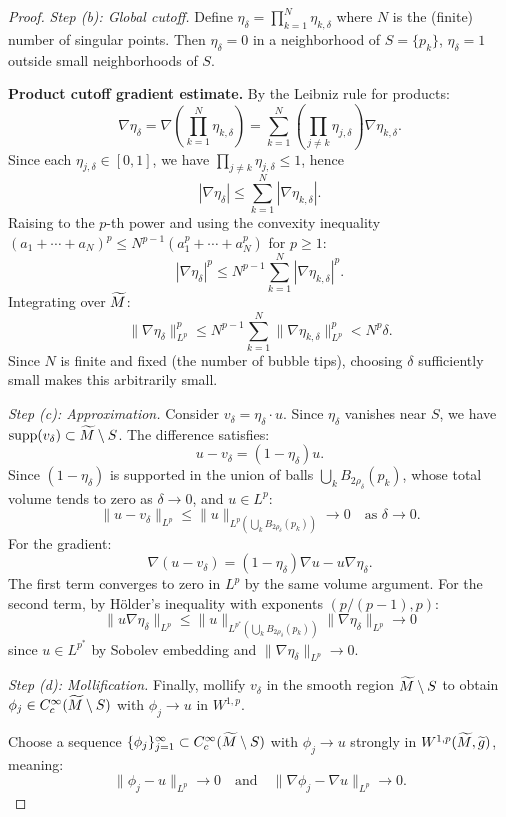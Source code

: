 \begin{proof}
\textit{Step (b): Global cutoff.} Define $\eta_\delta = \prod_{k=1}^N \eta_{k,\delta}$ where $N$ is the (finite) number of singular points. Then $\eta_\delta = 0$ in a neighborhood of $S = \{p_k\}$, $\eta_\delta = 1$ outside small neighborhoods of $S$.

\textbf{Product cutoff gradient estimate.} By the Leibniz rule for products:
\[
    \nabla\eta_\delta = \nabla\left(\prod_{k=1}^N \eta_{k,\delta}\right) = \sum_{k=1}^N \left(\prod_{j \ne k} \eta_{j,\delta}\right) \nabla\eta_{k,\delta}.
\]
Since each $\eta_{j,\delta} \in [0,1]$, we have $\prod_{j \ne k} \eta_{j,\delta} \le 1$, hence
\[
    |\nabla\eta_\delta| \le \sum_{k=1}^N |\nabla\eta_{k,\delta}|.
\]
Raising to the $p$-th power and using the convexity inequality $(a_1 + \cdots + a_N)^p \le N^{p-1}(a_1^p + \cdots + a_N^p)$ for $p \ge 1$:
\[
    |\nabla\eta_\delta|^p \le N^{p-1} \sum_{k=1}^N |\nabla\eta_{k,\delta}|^p.
\]
Integrating over $\widetilde{M}$:
\[
    \|\nabla \eta_\delta\|_{L^p}^p \le N^{p-1} \sum_{k=1}^N \|\nabla \eta_{k,\delta}\|_{L^p}^p < N^p \delta.
\]
Since $N$ is finite and fixed (the number of bubble tips), choosing $\delta$ sufficiently small makes this arbitrarily small.

\textit{Step (c): Approximation.} Consider $v_\delta = \eta_\delta \cdot u$. Since $\eta_\delta$ vanishes near $S$, we have $\mathrm{supp}(v_\delta) \subset \widetilde{M} \setminus S$. The difference satisfies:
\[
    u - v_\delta = (1 - \eta_\delta) u.
\]
Since $(1 - \eta_\delta)$ is supported in the union of balls $\bigcup_k B_{2\rho_\delta}(p_k)$, whose total volume tends to zero as $\delta \to 0$, and $u \in L^p$:
\[
    \|u - v_\delta\|_{L^p} \le \|u\|_{L^p(\bigcup_k B_{2\rho_\delta}(p_k))} \to 0 \quad \text{as } \delta \to 0.
\]
For the gradient:
\[
    \nabla(u - v_\delta) = (1-\eta_\delta)\nabla u - u \nabla\eta_\delta.
\]
The first term converges to zero in $L^p$ by the same volume argument. For the second term, by H\"older's inequality with exponents $(p/(p-1), p)$:
\[
    \|u \nabla\eta_\delta\|_{L^p} \le \|u\|_{L^{p^*}(\bigcup_k B_{2\rho_\delta}(p_k))} \|\nabla\eta_\delta\|_{L^p} \to 0
\]
since $u \in L^{p^*}$ by Sobolev embedding and $\|\nabla\eta_\delta\|_{L^p} \to 0$.

\textit{Step (d): Mollification.} Finally, mollify $v_\delta$ in the smooth region $\widetilde{M} \setminus S$ to obtain $\phi_j \in C^\infty_c(\widetilde{M} \setminus S)$ with $\phi_j \to u$ in $W^{1,p}$.

Choose a sequence $\{\phi_j\}_{j=1}^\infty \subset C^\infty_c(\widetilde{M} \setminus S)$ with $\phi_j \to u$ strongly in $W^{1,p}(\widetilde{M}, \widetilde{g})$, meaning:
\[
    \|\phi_j - u\|_{L^p} \to 0 \quad \text{and} \quad \|\nabla \phi_j - \nabla u\|_{L^p} \to 0.
\]


\end{proof}
